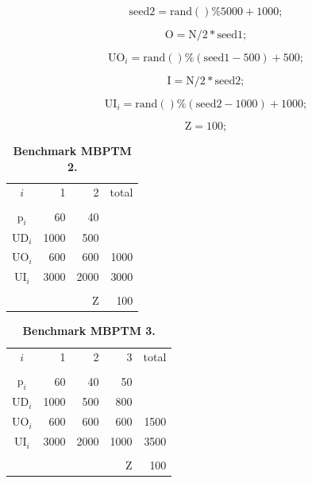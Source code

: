 \documentclass[10pt,fleqn,a4paper,twoside]{article}
\begin{document}
\begin{equation}
\textrm{seed2} = \textrm{rand}()\%5000 + 1000;
\end{equation}

\begin{equation}
\textrm{O} = \textrm{N}/2*\textrm{seed1};
\end{equation}

\begin{equation}
\textrm{UO}_i = \textrm{rand}()\%(\textrm{seed1}-500) + 500;
\end{equation}

\begin{equation}
\textrm{I} = \textrm{N}/2*\textrm{seed2};
\end{equation}

\begin{equation}
\textrm{UI}_i = \textrm{rand}()\%(\textrm{seed2}-1000) + 1000;
\end{equation}

\begin{equation}
\textrm{Z} = 100;
\end{equation}


\begin{table}[ht]
\begin{center}
\caption{\textbf{Benchmark MBPTM 2.}}
\begin{tabular}[c]{c r r r}
\\
$i$ & 1 & 2 & total \\
\cline {1-4} \\
$\textrm{p}_i$ & 60 & 40 & \\
$\textrm{UD}_i$ & 1000 & 500 & \\
$\textrm{UO}_i$ & 600 & 600 & 1000 \\
$\textrm{UI}_i$ & 3000 & 2000 & 3000 \\
\cline {1-4} \\
& & $\textrm{Z}$ & 100 \\
\end{tabular}
\label{tab:MBPTMP001}
\end{center}
\end{table}

\begin{table}[ht]
\begin{center}
\caption{\textbf{Benchmark MBPTM 3.}}
\begin{tabular}[c]{c r r r r}
\\
$i$ & 1 & 2 & 3 & total \\
\cline {1-5} \\
$\textrm{p}_i$ & 60 & 40 & 50 \\
$\textrm{UD}_i$ & 1000 & 500 & 800 \\
$\textrm{UO}_i$ & 600 & 600 & 600 & 1500 \\
$\textrm{UI}_i$ & 3000 & 2000 & 1000 & 3500 \\
\cline {1-5} \\
& & & $\textrm{Z}$ & 100 \\
\end{tabular}
\label{tab:MBPTMP002}
\end{center}
\end{table}
\end{document}
